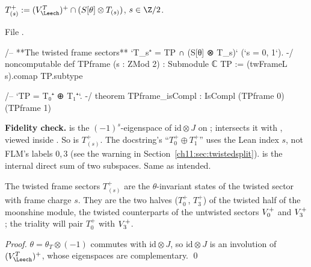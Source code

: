 \begin{definition}\label{ch11:def:TPframe}
$T_{(s)}^+:=(V_\Leech^T)^+\cap(S[\theta]\otimes T_{(s)})$, $s\in\Z/2$.
\end{definition}
\noindent File .
\begin{leancode}
/-- **The twisted frame sectors** `T_s⁺ = TP ∩ (S[θ] ⊗ T_s)` (`s = 0, 1`). -/
noncomputable def TPframe (s : ZMod 2) : Submodule ℂ TP := (twFrameL s).comap TP.subtype

/-- `TP = T₀⁺ ⊕ T₁⁺`. -/
theorem TPframe_isCompl : IsCompl (TPframe 0) (TPframe 1)
\end{leancode}
\begin{dictionary}
\textbf{Fidelity check.}   is the $(-1)^s$-eigenspace of $\mathrm{id}\otimes J$ on
;  intersects it with , viewed inside .  So
 is $T^+_{(s)}$.  The docstring's ``$T_0^+\oplus T_1^+$'' uses the Lean index $s$,
not FLM's labels $0,3$ (see the warning in Section~\ref{ch11:sec:twistedsplit}).  
is the internal direct sum of two subspaces.  Same as intended.
\end{dictionary}

\begin{physics}
The twisted frame sectors $T_{(s)}^+$ are the $\theta$-invariant states of the twisted sector with frame charge $s$. They are the two halves ($T_0^+$, $T_3^+$) of the twisted half of the moonshine module, the twisted counterparts of the untwisted sectors $V_0^{+}$ and $V_3^{+}$; the triality will pair $T_0^+$ with $V_3^{+}$.
\end{physics}
\emph{Proof.}  $\theta=\theta_T\otimes(-1)$ commutes with $\mathrm{id}\otimes J$, so $\mathrm{id}\otimes
J$ is an involution of $(V_\Leech^T)^+$, whose eigenspaces are complementary. \qed

